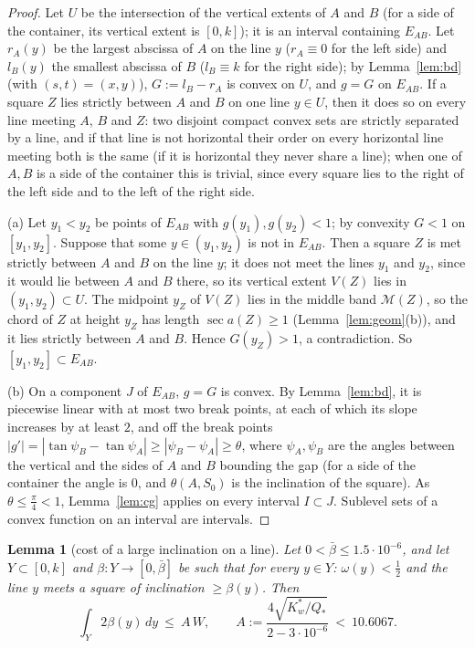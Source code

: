 \documentclass[11pt]{amsart}
\newtheorem{lemma}[theorem]{Lemma}
\theoremstyle{definition}
\theoremstyle{remark}
\begin{document}
\begin{proof}
Let $U$ be the intersection of the vertical extents of $A$ and $B$ (for a side of the container, its vertical extent is
$[0,k]$); it is an interval containing $E_{AB}$. Let $r_A(y)$ be the largest abscissa of $A$ on the line $y$ ($r_A\equiv0$ for the left
side) and $l_B(y)$ the smallest abscissa of $B$ ($l_B\equiv k$ for the right side); by Lemma~\ref{lem:bd} (with $(s,t)=(x,y)$),
$G:=l_B-r_A$ is convex on $U$, and $g=G$ on $E_{AB}$.
If a square $Z$ lies strictly between $A$ and $B$ on one line
$y\in U$, then it does so on every line meeting $A$, $B$ and $Z$: two disjoint compact convex sets are strictly
separated by a line, and if that line is not horizontal their order on every horizontal line meeting both is the same (if
it is horizontal they never share a line); when one of $A,B$ is a side of the container this is trivial, since every square
lies to the right of the left side and to the left of the right side.

(a) Let $y_1<y_2$ be points of $E_{AB}$ with $g(y_1),g(y_2)<1$; by convexity $G<1$ on $[y_1,y_2]$. Suppose that some
$y\in(y_1,y_2)$ is not in $E_{AB}$. Then a square $Z$ is met strictly between $A$ and $B$ on the line $y$; it does not meet the
lines $y_1$ and $y_2$, since it would lie between $A$ and $B$ there, so its vertical extent $V(Z)$ lies in $(y_1,y_2)\subset U$.
The midpoint $y_Z$ of $V(Z)$ lies in the middle band $\mathcal M(Z)$, so the chord of $Z$ at height $y_Z$ has length
$\sec a(Z)\ge1$ (Lemma~\ref{lem:geom}(b)), and it lies strictly between $A$ and $B$. Hence $G(y_Z)>1$, a contradiction. So
$[y_1,y_2]\subset E_{AB}$.

(b) On a component $J$ of $E_{AB}$, $g=G$ is convex. By Lemma~\ref{lem:bd}, it is piecewise linear with at most two break points,
at each of which its slope increases by at least $2$, and off the break points $|g'|=|\tan\psi_B-\tan\psi_A|\ge|\psi_B-\psi_A|\ge\theta$,
where $\psi_A,\psi_B$ are the angles between the vertical and the sides of $A$ and $B$ bounding the gap (for a side of the container
the angle is $0$, and $\theta(A,S_0)$ is the inclination of the square). As $\theta\le\frac\pi4<1$, Lemma~\ref{lem:cg} applies
on every interval $I\subset J$. Sublevel sets of a convex function on an interval are intervals.
\end{proof}

\begin{lemma}[cost of a large inclination on a line]\label{lem:Bh}
Let $0<\bar\beta\le1.5\cdot10^{-6}$, and let $Y\subset[0,k]$ and $\beta:Y\to[0,\bar\beta]$ be such that for every $y\in Y$:
$\omega(y)<\frac12$ and the line $y$ meets a square of inclination $\ge\beta(y)$. Then
\[
\int_Y2\beta(y)\,dy\ \le\ A\,W,\qquad A:=\frac{4\sqrt{K_w^*/Q_*}}{2-3\cdot10^{-6}}\ <\ 10.6067 .
\]
\end{lemma}
\end{document}
